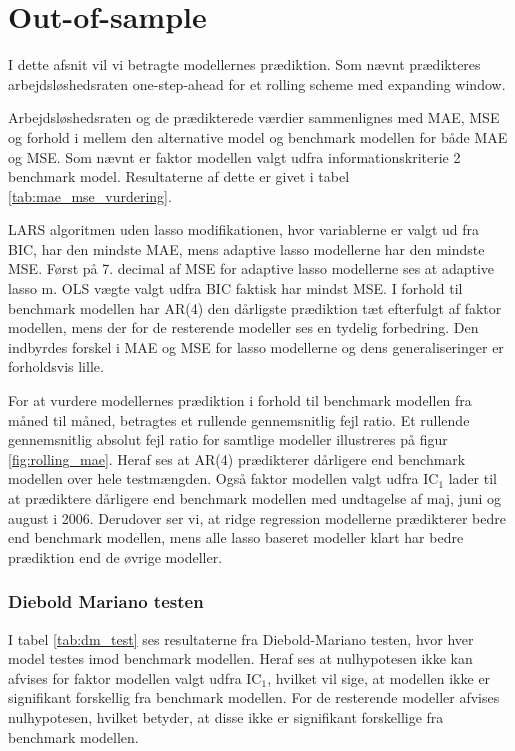 \chapter{Out-of-sample}
I dette afsnit vil vi betragte modellernes prædiktion.
Som nævnt prædikteres arbejdsløshedsraten one-step-ahead for et rolling scheme med expanding window.

Arbejdsløshedsraten og de prædikterede værdier sammenlignes med MAE, MSE og forhold i mellem den alternative model og benchmark modellen for både MAE og MSE.
Som nævnt er faktor modellen valgt udfra informationskriterie 2 benchmark model.
Resultaterne af dette er givet i tabel \ref{tab:mae_mse_vurdering}.
%

LARS algoritmen uden lasso modifikationen, hvor variablerne er valgt ud fra BIC, har den mindste MAE, mens adaptive lasso modellerne har den mindste MSE. 
Først på 7. decimal af MSE for adaptive lasso modellerne ses at adaptive lasso m. OLS vægte valgt udfra BIC faktisk har mindst MSE. 
I forhold til benchmark modellen har AR(4) den dårligste prædiktion tæt efterfulgt af faktor modellen, mens der for de resterende modeller ses en tydelig forbedring.
Den indbyrdes forskel i MAE og MSE for lasso modellerne og dens generaliseringer er forholdsvis lille.

For at vurdere modellernes prædiktion i forhold til benchmark modellen fra måned til måned, betragtes et rullende gennemsnitlig fejl ratio.
Et rullende gennemsnitlig absolut fejl ratio for samtlige modeller illustreres på figur \ref{fig:rolling_mae}.
Heraf ses at AR(4) prædikterer dårligere end benchmark modellen over hele testmængden.
Også faktor modellen valgt udfra IC$_1$ lader til at prædiktere dårligere end benchmark modellen med undtagelse af maj, juni og august i 2006.
Derudover ser vi, at ridge regression modellerne prædikterer bedre end benchmark modellen, mens alle lasso baseret modeller klart har bedre prædiktion end de øvrige modeller.
%
%

%
%

\subsection{Diebold Mariano testen}
I tabel \ref{tab:dm_test} ses resultaterne fra Diebold-Mariano testen, hvor hver model testes imod benchmark modellen.
Heraf ses at nulhypotesen ikke kan afvises for faktor modellen valgt udfra IC\(_1\), hvilket vil sige, at modellen ikke er signifikant forskellig fra benchmark modellen.
For de resterende modeller afvises nulhypotesen, hvilket betyder, at disse ikke er signifikant forskellige fra benchmark modellen.
%

%
\newpage
